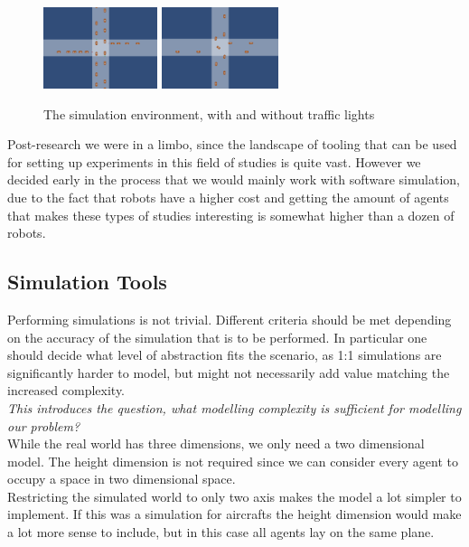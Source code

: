 \begin{figure}
\centering
\includegraphics[height=90px]{img/intersection_tl}
\includegraphics[height=90px]{img/intersection}
\caption{The simulation environment, with and without traffic lights}
\label{fig:intersection}
\end{figure}

Post-research we were in a limbo, since the landscape of tooling that can be used for setting up experiments in this field of studies is  quite  vast.
However we decided early in the process that we would mainly work with software simulation, due to the fact that robots have a higher cost and getting the amount of agents that makes these types of studies interesting is somewhat higher than a dozen of robots.

\subsection{Simulation Tools}
Performing simulations is not trivial. Different criteria should be met depending on the accuracy of the simulation that is to be performed.
In particular one should decide what level of abstraction fits the scenario, as 1:1 simulations are significantly harder to model, but might not necessarily add value matching the increased complexity.\\

\textit{This introduces the question, what modelling complexity is sufficient for modelling our problem?}\\

While the real world has three dimensions, we only need a two dimensional model.
The height dimension is not required since we can consider every agent to occupy a space in two dimensional space.\\
Restricting the simulated world to only two axis makes the model a lot simpler to implement.
If this was a simulation for aircrafts the height dimension would make a lot more sense to include,
but in this case all agents lay on the same plane.\\

